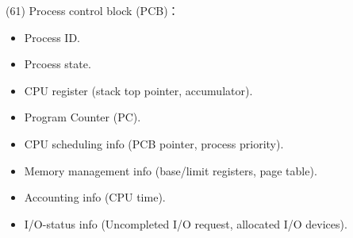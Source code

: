 \item \begin{theorem}{(61)} Process control block (PCB)：\begin{itemize}
        \item Process ID.
        \item Prcoess state.
        \item CPU register (stack top pointer, accumulator).
        \item Program Counter (PC).
        \item CPU scheduling info (PCB pointer, process priority).
        \item Memory management info (base/limit registers, page table).
        \item Accounting info (CPU time).
        \item I/O-status info (Uncompleted I/O request, allocated I/O devices).
    \end{itemize}
\end{theorem}

